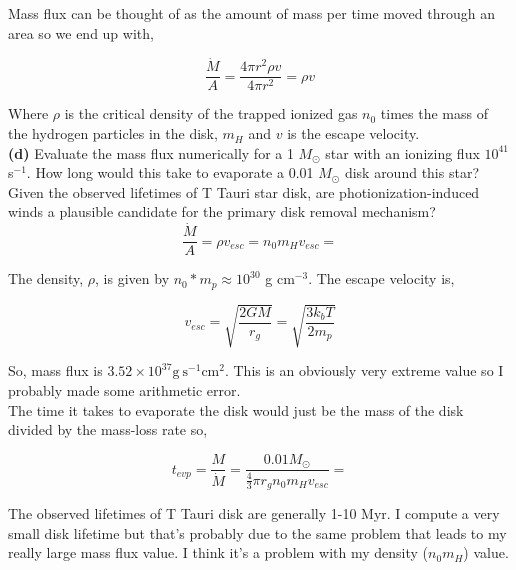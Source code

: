 \documentclass[12pt]{article}
\begin{document}
\noindent Mass flux can be thought of as the amount of mass per time moved through an area so we end up with, 

\begin{equation}
\frac{\dot{M}}{A} = \frac{4\pi r^2\rho v}{4\pi r^2} = \rho v
\end{equation}

\noindent Where $\rho$ is the critical density of the trapped ionized gas $n_0$ times the mass of the hydrogen particles in the disk, $m_H$ and $v$ is the escape velocity. \\



\noindent \textbf{(d)} Evaluate the mass flux numerically for a 1 $M_\odot$ star with an ionizing flux $10^{41}$ s$^{-1}$. How long would this take to evaporate a 0.01 $M_\odot$ disk around this star? Given the observed lifetimes of T Tauri star disk, are photionization-induced winds a plausible candidate for the primary disk removal mechanism? \\

\begin{equation}
\frac{\dot{M}}{A} = \rho v_{esc} = n_0 m_H v_{esc} = 
\end{equation}

\noindent The density, $\rho$, is given by $n_0*m_p \approx 10^{30}$ g cm$^{-3}$. The escape velocity is,

\begin{equation}
v_{esc} = \sqrt{\frac{2GM}{r_g}} = \sqrt{\frac{3k_b T}{2m_p}}  
\end{equation}

\noindent So, mass flux is $3.52 \times 10^{37} \mathrm{g~s}^{-1}\mathrm{cm}^2$.  This is an obviously very extreme value so I probably made some arithmetic error.\\

\noindent The time it takes to evaporate the disk would just be the mass of the disk divided by the mass-loss rate so,

\begin{equation}
t_{evp} = \frac{M}{\dot{M}} = \frac{0.01 M_{\odot}}{\frac{4}{3}\pi r_g n_0 m_H v_{esc}} = 
\end{equation} 

\noindent The observed lifetimes of T Tauri disk are generally 1-10 Myr. I compute a very small disk lifetime but that's probably due to the same problem that leads to my really large mass flux value. I think it's a problem with my density ($n_0m_H$) value.\\
\end{document}
